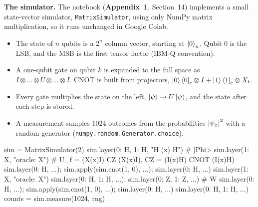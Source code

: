 \documentclass[a4paper, 10pt]{article}
\begin{document}
\begin{solution}
	\noindent \textbf{The simulator.} The notebook (\textbf{Appendix~1}, Section~14) implements a small state-vector simulator, \texttt{MatrixSimulator}, using only NumPy matrix multiplication, so it runs unchanged in Google Colab.
	\begin{itemize}
		\item The state of \( n \) qubits is a \( 2^n \) column vector, starting at \( \ket{0}_n \). Qubit 0 is the LSB, and the MSB is the first tensor factor (IBM-Q convention).
		\item A one-qubit gate on qubit \( k \) is expanded to the full space as \( I \otimes \dots \otimes U \otimes \dots \otimes I \). CNOT is built from projectors, \( \ket{0}\bra{0}_c \otimes I + \ket{1}\bra{1}_c \otimes X_t \).
		\item Every gate multiplies the state on the left, \( \ket{\psi} \to U\ket{\psi} \), and the state after each step is stored.
		\item A measurement samples \( 1024 \) outcomes from the probabilities \( \left|\psi_x\right|^2 \) with a random generator (\texttt{numpy.random.Generator.choice}).
	\end{itemize}
	\begin{codingbox*}
sim = MatrixSimulator(2)
sim.layer({0: H, 1: H}, "H (x) H")                 # |Phi>
sim.layer({1: X}, "oracle: X")                     # U_f = (X(x)I) CZ (X(x)I),  CZ = (I(x)H) CNOT (I(x)H)
sim.layer({0: H}, ...); sim.apply(sim.cnot(1, 0), ...); sim.layer({0: H}, ...)
sim.layer({1: X}, "oracle: X")
sim.layer({0: H, 1: H}, ...); sim.layer({0: Z, 1: Z}, ...)                       # W
sim.layer({0: H}, ...); sim.apply(sim.cnot(1, 0), ...); sim.layer({0: H}, ...)
sim.layer({0: H, 1: H}, ...)
counts = sim.measure(1024, rng)
\end{codingbox*}

	\myspace


\end{solution}
\end{document}
